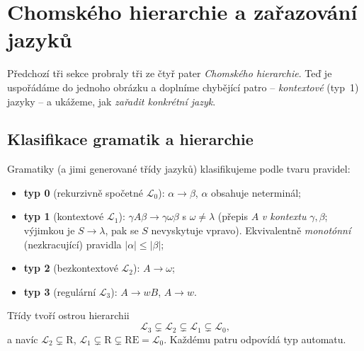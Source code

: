 \documentclass[11pt,a4paper]{article}
\begin{document}
\section{Chomského hierarchie a zařazování jazyků}

Předchozí tři sekce probraly tři ze čtyř pater \emph{Chomského hierarchie}. Teď je uspořádáme do jednoho obrázku a doplníme chybějící patro -- \emph{kontextové} (typ~1) jazyky -- a ukážeme, jak \emph{zařadit konkrétní jazyk}.

\subsection{Klasifikace gramatik a hierarchie}

\begin{definice}
Gramatiky (a jimi generované třídy jazyků) klasifikujeme podle tvaru pravidel:
\begin{itemize}
  \item \textbf{typ 0} (rekurzivně spočetné $\mathcal L_0$): $\alpha\to\beta$, $\alpha$ obsahuje neterminál;
  \item \textbf{typ 1} (kontextové $\mathcal L_1$): $\gamma A\beta\to\gamma\omega\beta$ s $\omega\neq\lambda$ (přepis $A$ \emph{v kontextu} $\gamma,\beta$; výjimkou je $S\to\lambda$, pak se $S$ nevyskytuje vpravo). Ekvivalentně \emph{monotónní} (nezkracující) pravidla $|\alpha|\le|\beta|$;
  \item \textbf{typ 2} (bezkontextové $\mathcal L_2$): $A\to\omega$;
  \item \textbf{typ 3} (regulární $\mathcal L_3$): $A\to wB$, $A\to w$.
\end{itemize}
\end{definice}

\begin{veta}
Třídy tvoří ostrou hierarchii
\[ \mathcal L_3\subsetneq\mathcal L_2\subsetneq\mathcal L_1\subsetneq\mathcal L_0, \]
a navíc $\mathcal L_2\subsetneq\mathrm R$, $\mathcal L_1\subsetneq\mathrm R\subsetneq\mathrm{RE}=\mathcal L_0$. Každému patru odpovídá typ automatu.
\end{veta}
\end{document}
